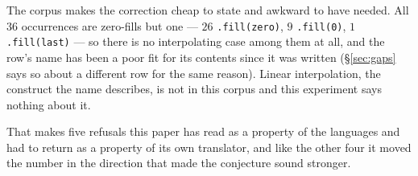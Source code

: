 \begin{remark}
The corpus makes the correction cheap to state and awkward to have needed. All $36$
occurrences are zero-fills but one --- $26$ \texttt{.fill(zero)}, $9$ \texttt{.fill(0)},
$1$ \texttt{.fill(last)} --- so there is no interpolating case among them at all, and
the row's name has been a poor fit for its contents since it was written
(\S\ref{sec:gaps} says so about a different row for the same reason). Linear
interpolation, the construct the name describes, is not in this corpus and this
experiment says nothing about it.

That makes five refusals this paper has read as a property of the languages and had to
return as a property of its own translator, and like the other four it moved the number
in the direction that made the conjecture sound stronger.
\end{remark}

